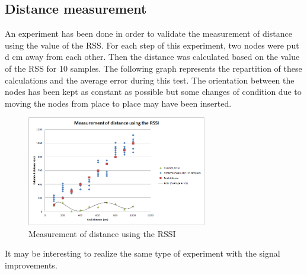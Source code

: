\documentclass[a4paper,10pt]{article}
\begin{document}
\subsection{Distance measurement}
An experiment has been done in order to validate the measurement of distance using the value of the RSS. For each step of this experiment, two
nodes were put d cm away from each other. Then the distance was calculated based on the value of the RSS for 10 samples. The following graph
represents the repartition of these calculations and the average error during this test. The orientation between the nodes has been kept
as constant as possible but some changes of condition due to moving the nodes from place to place may have been inserted.
\begin{figure}[H]
\centering
\includegraphics[width=0.7\textwidth]{distance_measurement.jpg}
\caption{Measurement of distance using the RSSI}
\end{figure}
\noindent
It may be interesting to realize the same type of experiment with the signal improvements.
\end{document}
